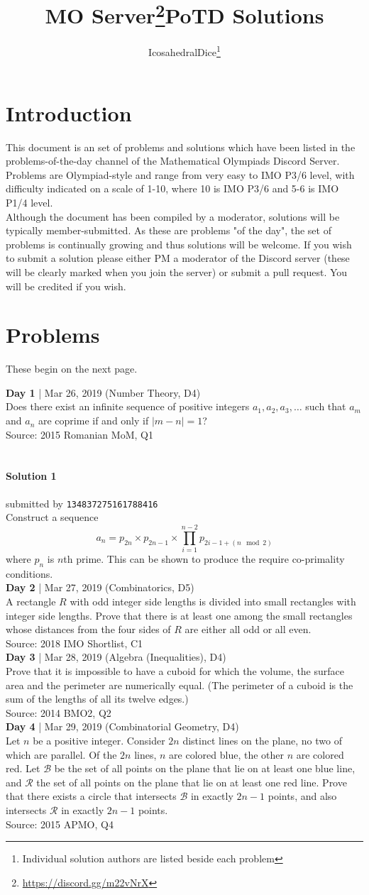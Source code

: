 \documentclass{article}
\title{MO Server\thanks{\url{https://discord.gg/m22vNrX}}\space\space PoTD Solutions}
\author{IcosahedralDice\thanks{Individual solution authors are listed beside each problem}}
\newcounter{day}
\newcounter{solution}
\newcommand{\oproblem}[6]{
\newpage
\textbf{Day #1} | #2 (#5, D#6)\\
#4 \\
Source: #3\\
}
\newcommand{\solution}[4]{
\paragraph{Solution #1} \hfill submitted by #2 \hfill \texttt{#3}\\
#4\\
}
\begin{document}
\maketitle
\section{Introduction}
This document is an set of problems and solutions which have been listed in the problems-of-the-day channel of the Mathematical Olympiads Discord Server. Problems are Olympiad-style and range from very easy to IMO P3/6 level, with difficulty indicated on a scale of 1-10, where 10 is IMO P3/6 and 5-6 is IMO P1/4 level. \\
Although the document has been compiled by a moderator, solutions will be typically member-submitted. As these are problems "of the day", the set of problems is continually growing and thus solutions will be welcome. If you wish to submit a solution please either PM a moderator of the Discord server (these will be clearly marked when you join the server) or submit a pull request. You will be credited if you wish. 

\section{Problems}
These begin on the next page. 
\oproblem{1}{Mar 26, 2019}{2015 Romanian MoM, Q1}{Does there exist an infinite sequence of positive integers $a_1, a_2, a_3, \dots$ such that $a_m$ and $a_n$ are coprime if and only if $\vert m - n \vert = 1$?}{Number Theory}{4}\\
\solution{1}{}{134837275161788416}{Construct a sequence $$a_n = p_{2n}\times p_{2n-1}\times \prod_{i=1}^{n-2} {p_{2i-1+(n \mod 2)}}$$ where $p_n$ is $n$th prime. This can be shown to produce the require co-primality conditions.}

\oproblem{2}{Mar 27, 2019}{2018 IMO Shortlist, C1}{A rectangle $R$ with odd integer side lengths is divided into small rectangles with integer side lengths. Prove that there is at least one among the small rectangles whose distances from the four sides of $R$ are either all odd or all even.}{Combinatorics}{5}

\oproblem{3}{Mar 28, 2019}{2014 BMO2, Q2}{Prove that it is impossible to have a cuboid for which the volume, the surface area and the perimeter are numerically equal. (The perimeter of a cuboid is the sum of the lengths of all its twelve edges.)}{Algebra (Inequalities)}{4}

\oproblem{4}{Mar 29, 2019}{2015 APMO, Q4}{Let $n$ be a positive integer. Consider $2n$ distinct lines on the plane, no two of which are parallel. Of the $2n$ lines, $n$ are colored blue, the other $n$ are colored red. Let $\mathcal{B}$ be the set of all points on the plane that lie on at least one blue line, and $\mathcal{R}$ the set of all points on the plane that lie on at least one red line. Prove that there exists a circle that intersects $\mathcal{B}$ in exactly $2n-1$ points, and also intersects $\mathcal{R}$ in exactly $2n-1$ points.}{Combinatorial Geometry}{4}
\end{document}
